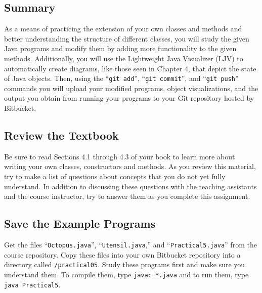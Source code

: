 



\subsection*{Summary}
\vspace*{-.05in}

As a means of practicing the extension of your own classes and methods and better understanding the structure of
different classes, you will study the given Java programs and modify them by adding more functionality to the given
methods.  Additionally, you will use the Lightweight Java Visualizer (LJV) to automatically create diagrams, like those
seen in Chapter 4, that depict the state of Java objects.  Then, using the ``{\tt git add}'', ``{\tt git commit}'', and
``{\tt git push}'' commands you will upload your modified programs, object visualizations, and the output you obtain
from running your programs to your Git repository hosted by Bitbucket.  

\vspace*{-.15in}
\subsection*{Review the Textbook}
\vspace*{-.05in}
Be sure to read Sections 4.1 through 4.3 of your book to learn more about writing your own classes, constructors and methods.  As you review this material, try to make a list of questions about concepts that you do not yet fully
understand.  In addition to discussing these questions with the teaching assistants and the course instructor, try to
answer them as you complete this assignment.

\vspace*{-.15in}
\subsection*{Save the Example Programs}
\vspace*{-.05in}
Get the files ``{\tt Octopus.java}'', ``{\tt Utensil.java},'' and
``{\tt Practical5.java}'' from the course repository. Copy these files 
into your own Bitbucket repository into a directory called {\tt /practical05}. Study 
these programs first and make sure you understand them. To compile them, type
{\tt javac *.java} and to run them, type {\tt java Practical5}.

